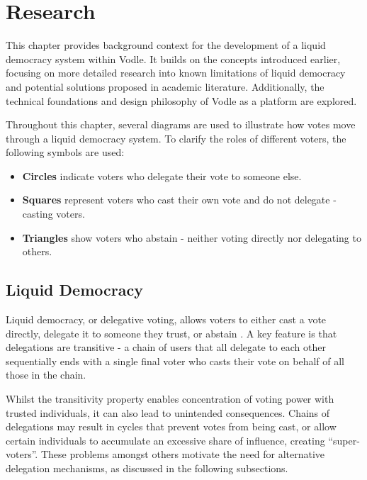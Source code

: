 \chapter{Research}
\label{ch:background}
This chapter provides background context for the development of a liquid democracy system within Vodle. It builds on the concepts introduced earlier, focusing on more detailed research into known limitations of liquid democracy and potential solutions proposed in academic literature. Additionally, the technical foundations and design philosophy of Vodle as a platform are explored.

Throughout this chapter, several diagrams are used to illustrate how votes move through a liquid democracy system. To clarify the roles of different voters, the following symbols are used:
\begin{itemize}
    \item \textbf{Circles} indicate voters who delegate their vote to someone else.
    \item \textbf{Squares} represent voters who cast their own vote and do not delegate - casting voters.
    \item \textbf{Triangles} show voters who abstain - neither voting directly nor delegating to others.
\end{itemize}

\section{Liquid Democracy}

Liquid democracy, or delegative voting, allows voters to either cast a vote directly, delegate it to someone they trust, or abstain \citep{blum_liquid_2016}. A key feature is that delegations are transitive - a chain of users that all delegate to each other sequentially ends with a single final voter who casts their vote on behalf of all those in the chain.

Whilst the transitivity property enables concentration of voting power with trusted individuals, it can also lead to unintended consequences. Chains of delegations may result in cycles that prevent votes from being cast, or allow certain individuals to accumulate an excessive share of influence, creating ``super-voters''. These problems amongst others motivate the need for alternative delegation mechanisms, as discussed in the following subsections.


